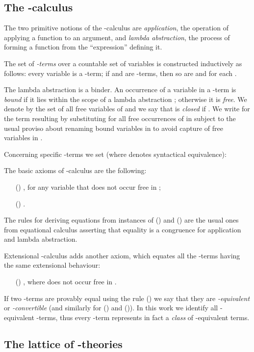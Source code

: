 \documentclass[english]{llncs}
\begin{document}
\subsection{The -calculus}

The two primitive notions of the -calculus are \emph{application}, the operation of applying a function to an argument, and 
\emph{lambda abstraction}, the process of forming a function from the ``expression'' defining it.

The set  of {\em -terms} over a countable set  of variables is constructed inductively as follows: 
every variable  is a -term; if  and  are -terms, then so are  and  for each .

The lambda abstraction is a binder. An occurrence of a variable  in a -term is \emph{bound} if it lies within the scope of a 
lambda abstraction ; otherwise it is \emph{free}.
We denote by  the set of all free variables of  and we say that  is {\em closed} if .
We write  for the term resulting by substituting  for all free occurrences of  in  subject to the usual proviso about renaming bound variables
in  to avoid capture of free variables in .

Concerning specific -terms we set (where  denotes syntactical equivalence):


The basic axioms of -calculus are the following:
\begin{itemize}
\item [()] , for any variable  that does not occur free in ;
\item [()] .
\end{itemize}
The rules for deriving equations from instances of () and () are the usual ones from equational calculus asserting that equality is a
congruence for application and lambda abstraction. 

Extensional -calculus adds another axiom, which equates all the -terms having the same extensional behaviour:
\begin{itemize}
\item[()] , where  does not occur free in .
\end{itemize}

If two -terms are provably equal using the rule () we say that they are \emph{-equivalent} or \emph{-convertible} 
(and similarly for () and ()).
In this work we identify all -equivalent -terms, thus every -term represents in fact a {\em class} of -equivalent terms. 


\subsection{The lattice of -theories}
\end{document}
